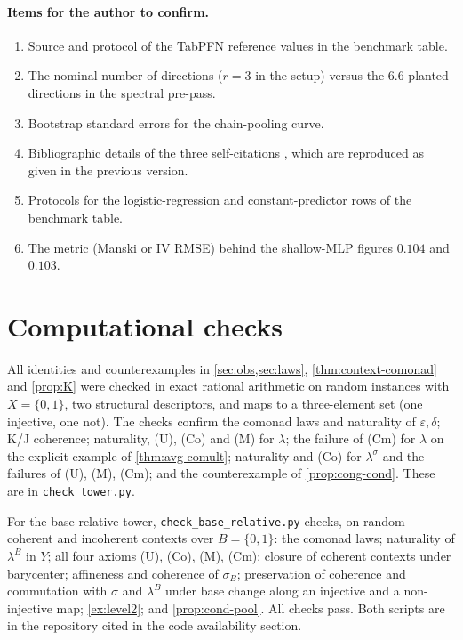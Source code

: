 \documentclass[11pt]{article}
\theoremstyle{definition}
\theoremstyle{remark}
\newcommand{\lb}{\bar\lambda}
\newcommand{\ls}{\lambda^{\sigma}}
\begin{document}
\paragraph{Items for the author to confirm.}
\begin{enumerate}[leftmargin=*,resume]
\item\label{it:tabpfn} Source and protocol of the TabPFN reference values in the benchmark table.
\item The nominal number of directions ($r=3$ in the setup) versus the $6.6$ planted directions in
  the spectral pre-pass.
\item Bootstrap standard errors for the chain-pooling curve.
\item Bibliographic details of the three self-citations
  \cite{Awasthi-Hierarchy,Awasthi-Holonomy,Awasthi-ThreeLayers}, which are reproduced as given in the
  previous version.
\item Protocols for the logistic-regression and constant-predictor rows of the benchmark table.
\item The metric (Manski or IV RMSE) behind the shallow-MLP figures $0.104$ and $0.103$.
\end{enumerate}

\section{Computational checks}

All identities and counterexamples in \cref{sec:obs,sec:laws}, \cref{thm:context-comonad} and
\cref{prop:K} were checked in exact rational arithmetic on random instances with $X=\{0,1\}$, two
structural descriptors, and maps to a three-element set (one injective, one not). The checks confirm
the comonad laws and naturality of $\varepsilon,\delta$; K/J coherence; naturality, (U), (Co) and (M)
for $\lb$; the failure of (Cm) for $\lb$ on the explicit example of \cref{thm:avg-comult}; naturality
and (Co) for $\ls$ and the failures of (U), (M), (Cm); and the counterexample of
\cref{prop:cong-cond}. These are in \texttt{check\_tower.py}.

For the base-relative tower, \texttt{check\_base\_relative.py} checks, on random coherent and
incoherent contexts over $B=\{0,1\}$: the comonad laws; naturality of $\lambda^B$ in $Y$; all four
axioms (U), (Co), (M), (Cm); closure of coherent contexts under barycenter; affineness and coherence
of $\sigma_B$; preservation of coherence and commutation with $\sigma$ and $\lambda^B$ under base change
along an injective and a non-injective map; \cref{ex:level2}; and \cref{prop:cond-pool}. All checks
pass. Both scripts are in the repository cited in the code availability section.
\end{document}
